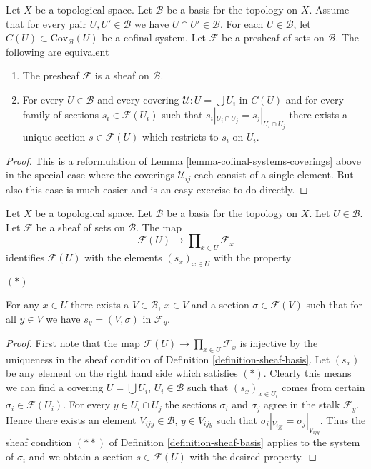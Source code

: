 \begin{lemma}
\label{lemma-cofinal-systems-coverings-standard-case}
Let $X$ be a topological space.
Let $\mathcal{B}$ be a basis for the topology on $X$.
Assume that for every pair $U,U' \in \mathcal{B}$
we have $U \cap U' \in \mathcal{B}$.
For each $U \in \mathcal{B}$, let $C(U) \subset \text{Cov}_{\mathcal{B}}(U)$
be a cofinal system.
Let $\mathcal{F}$ be a presheaf of sets on $\mathcal{B}$.
The following are equivalent
\begin{enumerate}
\item The presheaf $\mathcal{F}$ is a sheaf on $\mathcal{B}$.
\item For every $U \in \mathcal{B}$ and every covering
$\mathcal{U} : U = \bigcup U_i$ in $C(U)$ and for every
family of sections $s_i \in \mathcal{F}(U_i)$ such
that $s_i|_{U_i \cap U_j} = s_j|_{U_i \cap U_j}$ there
exists a unique section $s \in \mathcal{F}(U)$ which
restricts to $s_i$ on $U_i$.
\end{enumerate}
\end{lemma}

\begin{proof}
This is a reformulation of
Lemma \ref{lemma-cofinal-systems-coverings} above
in the special case where the coverings $\mathcal{U}_{ij}$
each consist of a single element. But also this case is much
easier and is an easy exercise to do directly. 
\end{proof}

\begin{lemma}
\label{lemma-condition-star-sections}
Let $X$ be a topological space.
Let $\mathcal{B}$ be a basis for the topology on $X$.
Let $U \in \mathcal{B}$.
Let $\mathcal{F}$ be a sheaf of sets on $\mathcal{B}$. 
The map
$$
\mathcal{F}(U) \to \prod\nolimits_{x \in U} \mathcal{F}_x
$$
identifies $\mathcal{F}(U)$ with the elements $(s_x)_{x\in U}$
with the property 
\begin{list}{$(*)$}{}
\item For any $x \in U$ there exists a $V \in \mathcal{B}$,
$x \in V$ and a section $\sigma \in \mathcal{F}(V)$ such that
for all $y \in V$ we have $s_y = (V, \sigma)$ in $\mathcal{F}_y$.
\end{list}
\end{lemma}

\begin{proof}
First note that the map
$\mathcal{F}(U) \to \prod\nolimits_{x \in U} \mathcal{F}_x$
is injective by the uniqueness in the sheaf condition
of Definition \ref{definition-sheaf-basis}. Let $(s_x)$ be
any element on the right hand side which satisfies $(*)$.
Clearly this means we can find a covering $U = \bigcup U_i$,
$U_i \in \mathcal{B}$ such that $(s_x)_{x \in U_i}$ comes from
certain $\sigma_i \in \mathcal{F}(U_i)$. For every $y \in U_i \cap U_j$
the sections $\sigma_i$ and $\sigma_j$ agree in the stalk
$\mathcal{F}_y$. Hence there exists an element $V_{ijy} \in \mathcal{B}$,
$y \in V_{ijy}$ such that $\sigma_i|_{V_{ijy}} = \sigma_j|_{V_{ijy}}$.
Thus the sheaf condition $(**)$ of Definition \ref{definition-sheaf-basis}
applies to the system of $\sigma_i$ and we obtain a section
$s \in \mathcal{F}(U)$ with the desired property.
\end{proof}

